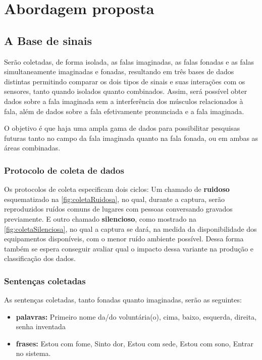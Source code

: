 \chapter{Abordagem proposta}
	\label{chap:propApproach}

	\section{A Base de sinais}
   	\label{sec:baseDeSinais}
		\par Serão coletadas, de forma isolada, as falas imaginadas, as falas fonadas e as falas simultaneamente imaginadas e fonadas, resultando em três bases de dados distintas permitindo comparar os dois tipos de sinais e suas interações com os sensores, tanto quando isolados quanto combinados. Assim, será possível obter dados sobre a fala imaginada sem a interferência dos músculos relacionados à fala, além de dados sobre a fala efetivamente pronunciada e a fala imaginada.
		
		\par O objetivo é que haja uma ampla gama de dados para possibilitar pesquisas futuras tanto no campo da fala imaginada quanto na fala fonada, ou em ambas as áreas combinadas.
		
	    \subsection{Protocolo de coleta de dados}
		    
		    \par Os protocolos de coleta especificam dois ciclos: Um chamado de \textbf{ruidoso} esquematizado na \autoref{fig:coletaRuidosa}, no qual, durante a captura, serão reproduzidos ruídos comuns de lugares com pessoas conversando gravados previamente. E outro chamado \textbf{silencioso}, como mostrado na \autoref{fig:coletaSilenciosa}, no qual a captura se dará, na medida da disponibilidade dos equipamentos disponíveis, com o menor ruído ambiente possível. Dessa forma também se espera conseguir avaliar qual o impacto dessa variante na produção e classificação dos dados.
		    
		    \subsection{Sentenças coletadas}
		    
			    \par As sentenças coletadas, tanto fonadas quanto imaginadas, serão as seguintes:
			    \begin{itemize}
			    	\item \textbf{palavras:} Primeiro nome da/do voluntária(o), cima, baixo, esquerda, direita, senha inventada
			    	\item \textbf{frases:} Estou com fome, Sinto dor, Estou com sede, Estou com sono, Entrar no sistema.
			    \end{itemize}
			    
